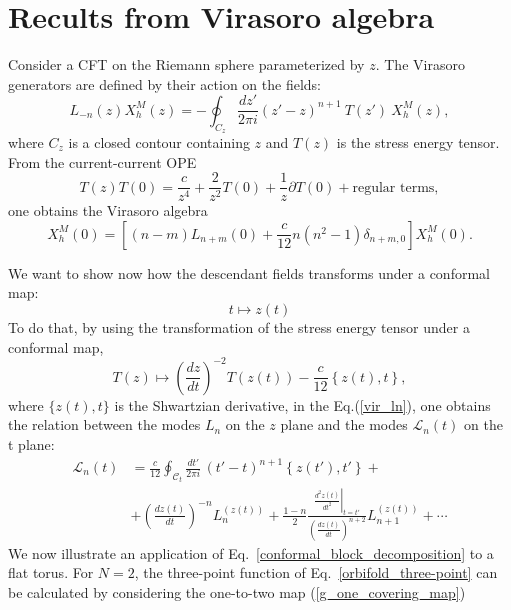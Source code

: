 \documentclass[a4paper,11pt]{article}
\begin{document}
\appendix
\section{Recults from Virasoro algebra}\label{app_ward}

Consider a CFT on the Riemann sphere parameterized by $z$.
The Virasoro generators are defined by their action on the fields:
\begin{equation}
\label{vir_ln}
 L_{-n}(z)X^{M}_h(z)=-\oint_{C_{z}}\frac{dz'}{2\pi i}(z'-z)^{n+1}~T(z')~X^{M}_h(z),
\end{equation}
where $C_{z}$ is a closed contour containing $z$ and $T(z)$ is the stress energy tensor. 
From the current-current OPE
\begin{equation}
T(z) T(0)= \frac{c}{z^4}+ \frac{2}{z^2} T(0)+\frac{1}{z}\partial T (0)+\text{regular terms},
\end{equation} 
one obtains the  Virasoro algebra
\begin{equation}
 [L_n(0), L_{m}(0)]X^{M}_h(0) =\left[(n-m) L_{n+m}(0)+\frac{c}{12}n(n^2-1)\delta_{n+m, 0}\right]X^{M}_h(0).
\end{equation}

We want to show now how the descendant fields transforms under a conformal map:
\begin{equation}
t \mapsto z(t)
\end{equation}
To do that, by using the transformation of the stress energy tensor under a conformal map,
\begin{equation}
T(z)\mapsto \left(\frac{d z}{d t}\right)^{-2} T(z(t))-\frac{c}{12}\left\{z(t),t\right\},
\end{equation}
where $\{z(t),t\}$ is the Shwartzian derivative,  in the Eq.(\ref{vir_ln}), one obtains the relation between the modes $L_{n}$ on the $z$ plane and the modes $\mathcal{L}_n(t)$ on the t plane:
\begin{equation}\label{gengen}
\begin{aligned}
 \mathcal{L}_{n}(t)&=\frac{c}{12} \oint_{\mathcal{C}_t}\frac{d t'}{2\pi i}\, (t'-t)^{n+1}\left\{z(t'),t'\right\} +\\
 & +\left(\frac{d z(t)}{d t}\right)^{-n} L_n^{(z(t))}
 +\frac{1-n}{2}\frac{\left.\frac{d^2 z(t)}{d t^2}\right|_{t=t'}}{\left(\frac{d z(t)}{d t}\right)^{n+2}}L_{n+1}^{(z(t))}+\cdots
 \end{aligned}
\end{equation}
We now illustrate an application of Eq.~\eqref{conformal_block_decomposition} to a flat torus. For $N=2$, the three-point function of Eq.~\eqref{orbifold_three-point} 
can be calculated by considering the  one-to-two map (\ref{g_one_covering_map})
\end{document}
